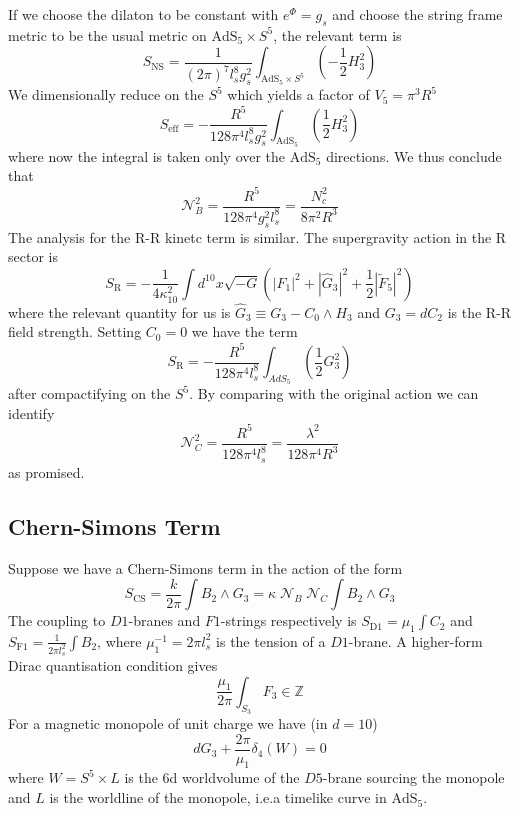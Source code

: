 \documentclass[aps,preprint,nofootinbib,preprintnumbers,eqsecnum,superscriptaddress]{revtex4}
\begin{document}
\begin{appendix}
If we choose the dilaton to be constant with $e^\Phi = g_s$ and choose the string frame metric to be the usual metric on $\text{AdS}_5 \times S^5$, the relevant term is
\begin{equation}
	S_{\text{NS}}	= \frac{1}{(2\pi)^7 l_s^8 g_s^2} \int_{\text{AdS}_5 \times S^5}{\left(- \frac{1}{2} H_3^2 \right)}
\end{equation}
We dimensionally reduce on the $S^5$ which yields a factor of $V_5 = \pi^3 R^5$
\begin{equation}
	S_{\text{eff}} = -\frac{R^5}{128 \pi^4 l_s^8 g_s^2} \int_{\text{AdS}_5}{\left(\frac{1}{2} H_3^2 \right)}
\end{equation}
where now the integral is taken only over the $\text{AdS}_5$ directions. We thus conclude that
\begin{equation}
\mathcal{N}_B^2 = \frac{R^5}{128 \pi^4 g_s^2 l_s^8} = \frac{N_c^2}{8 \pi^2 R^3}
\end{equation}
The analysis for the R-R kinetc term is similar. The supergravity action in the R sector is
\begin{equation}
S_{\text{R}} = - \frac{1}{4 \kappa_{10}^2} \int{d^{10}x \sqrt{-G}\left(|F_1|^2 + |\hat{G}_3|^2 + \frac{1}{2}|\tilde{F}_5|^2\right)}
\end{equation}
where the relevant quantity for us is $\hat{G}_3 \equiv G_3 - C_0 \wedge H_3$ and $G_3 = dC_2$ is the R-R field strength. Setting $C_0 = 0$ we have the term
\begin{equation}
S_{\text{R}} = -\frac{R^5}{128 \pi^4 l_s^8} \int_{AdS_5}{\left(\frac{1}{2}G_3^2\right)}
\end{equation}
after compactifying on the $S^5$. By comparing with the original action we can identify
\begin{equation}
\mathcal{N}_C^2 = \frac{R^5}{128 \pi^4 l_s^8} = \frac{\lambda^2}{128 \pi^4 R^3}
\end{equation}
as promised.
\subsection{Chern-Simons Term} \label{app:CS} 
\label{Chern-Simons appendix}
Suppose we have a Chern-Simons term in the action of the form
\begin{equation}
	S_{\text{CS}} = \frac{k}{2\pi}\int{B_2 \wedge G_3} = \kappa \; \mathcal{N}_B \; \mathcal{N}_C \int{B_2 \wedge G_3}
\end{equation}
The coupling to $D1$-branes and $F1$-strings respectively is $S_{\text{D1}} = \mu_1 \int{C_2}$ and $S_{\text{F1}} = \frac{1}{2\pi l_s^2}\int{B_2}$, where $\mu_1^{-1} = 2\pi l_s^2$ is the tension of a $D1$-brane.
A higher-form Dirac quantisation condition gives
\begin{equation}
	\frac{\mu_{1}}{2 \pi} \int_{S_{3}} F_{3} \in \mathbb{Z} \label{D5brane} 
\end{equation}
For a magnetic monopole of unit charge we have (in $d = 10$)
\begin{equation}
dG_3 + \frac{2\pi}{\mu_1} \delta_4(W) = 0
\end{equation}
where $W = S^5 \times L$ is the 6d worldvolume of the $D5$-brane sourcing the monopole and $L$ is the worldline of the monopole, i.e.a timelike curve in $\text{AdS}_5$.


\end{appendix}
\end{document}
